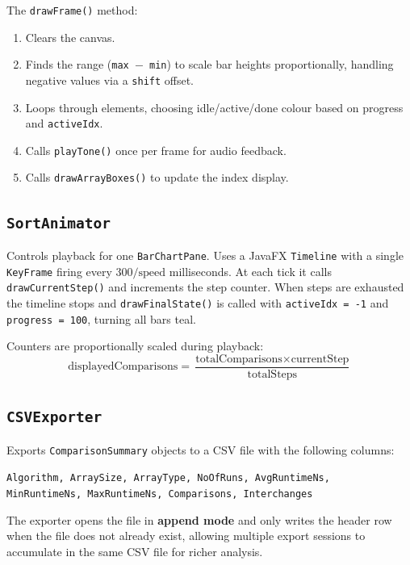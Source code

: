 \documentclass[12pt,a4paper]{article}
\begin{document}
The \texttt{drawFrame()} method:
\begin{enumerate}[nosep]
    \item Clears the canvas.
    \item Finds the range (\texttt{max $-$ min}) to scale bar heights
          proportionally, handling negative values via a \texttt{shift} offset.
    \item Loops through elements, choosing idle/active/done colour based on
          progress and \texttt{activeIdx}.
    \item Calls \texttt{playTone()} once per frame for audio feedback.
    \item Calls \texttt{drawArrayBoxes()} to update the index display.
\end{enumerate}

\subsection{\texttt{SortAnimator}}

Controls playback for one \texttt{BarChartPane}. Uses a JavaFX
\texttt{Timeline} with a single \texttt{KeyFrame} firing every
$300 / \text{speed}$ milliseconds. At each tick it calls
\texttt{drawCurrentStep()} and increments the step counter. When steps are
exhausted the timeline stops and \texttt{drawFinalState()} is called with
\texttt{activeIdx = -1} and \texttt{progress = 100}, turning all bars teal.

Counters are proportionally scaled during playback:
\[
\text{displayedComparisons} = \frac{\text{totalComparisons} \times \text{currentStep}}{\text{totalSteps}}
\]

\subsection{\texttt{CSVExporter}}

Exports \texttt{ComparisonSummary} objects to a CSV file with the following
columns:

\begin{center}
\texttt{Algorithm, ArraySize, ArrayType, NoOfRuns, AvgRuntimeNs,}\\
\texttt{MinRuntimeNs, MaxRuntimeNs, Comparisons, Interchanges}
\end{center}

The exporter opens the file in \textbf{append mode} and only writes the header
row when the file does not already exist, allowing multiple export sessions to
accumulate in the same CSV file for richer analysis.
\end{document}
